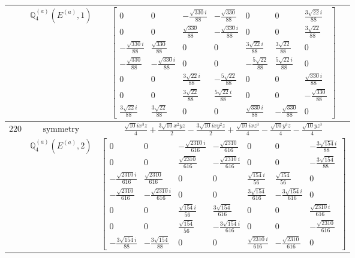 \documentclass[fleqn,8pt,landscape]{jsarticle}
\begin{document}
\begin{longtable}{ccc}
$  $ & $ \mathbb{Q}_{4}^{(a)}(E^{(a)},1) $ & $ \begin{bmatrix} 0 & 0 & - \frac{\sqrt{330} i}{88} & - \frac{\sqrt{330}}{88} & 0 & 0 & \frac{3 \sqrt{22} i}{88} \\ 0 & 0 & \frac{\sqrt{330}}{88} & - \frac{\sqrt{330} i}{88} & 0 & 0 & \frac{3 \sqrt{22}}{88} \\ - \frac{\sqrt{330} i}{88} & \frac{\sqrt{330}}{88} & 0 & 0 & \frac{3 \sqrt{22} i}{88} & \frac{3 \sqrt{22}}{88} & 0 \\ - \frac{\sqrt{330}}{88} & - \frac{\sqrt{330} i}{88} & 0 & 0 & - \frac{5 \sqrt{22}}{88} & \frac{5 \sqrt{22} i}{88} & 0 \\ 0 & 0 & \frac{3 \sqrt{22} i}{88} & - \frac{5 \sqrt{22}}{88} & 0 & 0 & \frac{\sqrt{330} i}{88} \\ 0 & 0 & \frac{3 \sqrt{22}}{88} & \frac{5 \sqrt{22} i}{88} & 0 & 0 & - \frac{\sqrt{330}}{88} \\ \frac{3 \sqrt{22} i}{88} & \frac{3 \sqrt{22}}{88} & 0 & 0 & \frac{\sqrt{330} i}{88} & - \frac{\sqrt{330}}{88} & 0 \end{bmatrix} $ \\ \hline
$ 220 $ & $ \text{symmetry} $ & $ \frac{\sqrt{10} i x^{3} z}{4} + \frac{3 \sqrt{10} x^{2} y z}{2} - \frac{3 \sqrt{10} i x y^{2} z}{2} + \frac{\sqrt{10} i x z^{3}}{4} - \frac{\sqrt{10} y^{3} z}{4} - \frac{\sqrt{10} y z^{3}}{4} $ \\
$  $ & $ \mathbb{Q}_{4}^{(a)}(E^{(a)},2) $ & $ \begin{bmatrix} 0 & 0 & - \frac{\sqrt{2310} i}{616} & - \frac{\sqrt{2310}}{616} & 0 & 0 & - \frac{3 \sqrt{154} i}{88} \\ 0 & 0 & \frac{\sqrt{2310}}{616} & - \frac{\sqrt{2310} i}{616} & 0 & 0 & - \frac{3 \sqrt{154}}{88} \\ - \frac{\sqrt{2310} i}{616} & \frac{\sqrt{2310}}{616} & 0 & 0 & \frac{\sqrt{154} i}{56} & \frac{\sqrt{154}}{56} & 0 \\ - \frac{\sqrt{2310}}{616} & - \frac{\sqrt{2310} i}{616} & 0 & 0 & \frac{3 \sqrt{154}}{616} & - \frac{3 \sqrt{154} i}{616} & 0 \\ 0 & 0 & \frac{\sqrt{154} i}{56} & \frac{3 \sqrt{154}}{616} & 0 & 0 & \frac{\sqrt{2310} i}{616} \\ 0 & 0 & \frac{\sqrt{154}}{56} & - \frac{3 \sqrt{154} i}{616} & 0 & 0 & - \frac{\sqrt{2310}}{616} \\ - \frac{3 \sqrt{154} i}{88} & - \frac{3 \sqrt{154}}{88} & 0 & 0 & \frac{\sqrt{2310} i}{616} & - \frac{\sqrt{2310}}{616} & 0 \end{bmatrix} $ \\ \hline

\end{longtable}
\end{document}
